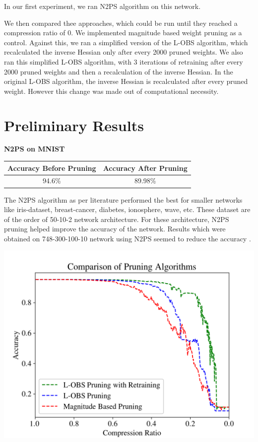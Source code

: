 \documentclass{article}
\begin{document}
In our first experiment, we ran N2PS algorithm on this network.

We then compared thee approaches, which could be run until they reached a compression ratio of 0. We implemented magnitude based weight pruning as a control. Against this, we ran a simplified version of the L-OBS algorithm, which recalculated the inverse Hessian only after every 2000 pruned weights. We also ran this simplified L-OBS algorithm, with 3 iterations of retraining after every 2000 pruned weights and then a recalculation of the inverse Hessian. In the original L-OBS algorithm, the inverse Hessian is recalculated after every pruned weight. However this change was made out of computational necessity.

\section{Preliminary Results}
\label{Preliminary Results}

\begin{center}
\textbf{N2PS on MNIST}

 \begin{tabular}{|c| c|} 
 \hline
Accuracy Before Pruning & Accuracy After Pruning  \\
 \hline
 94.6\% & 89.98\%  \\ 
 \hline
 \end{tabular}
\end{center}
The N2PS algorithm as per literature performed the best for smaller networks like iris-dataset, breast-cancer, diabetes, ionosphere, wave, etc. These dataset are of the order of 50-10-2 network architecture. For these architecture, N2PS pruning helped improve the accuracy of the network. Results which were obtained on 748-300-100-10 network using N2PS seemed to reduce the accuracy .

\includegraphics[scale=0.65]{Comparison}
\end{document}
